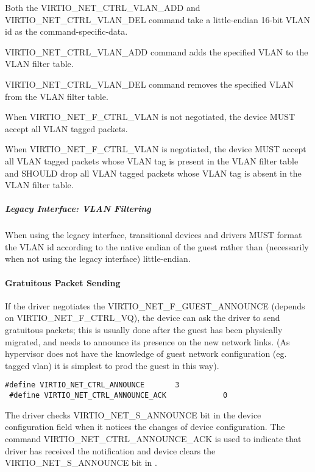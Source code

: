 Both the VIRTIO_NET_CTRL_VLAN_ADD and VIRTIO_NET_CTRL_VLAN_DEL
command take a little-endian 16-bit VLAN id as the command-specific-data.

VIRTIO_NET_CTRL_VLAN_ADD command adds the specified VLAN to the
VLAN filter table.

VIRTIO_NET_CTRL_VLAN_DEL command removes the specified VLAN from
the VLAN filter table.


When VIRTIO_NET_F_CTRL_VLAN is not negotiated, the device MUST
accept all VLAN tagged packets.

When VIRTIO_NET_F_CTRL_VLAN is negotiated, the device MUST
accept all VLAN tagged packets whose VLAN tag is present in
the VLAN filter table and SHOULD drop all VLAN tagged packets
whose VLAN tag is absent in the VLAN filter table.

\subparagraph{Legacy Interface: VLAN Filtering}\label{sec:Device Types / Network Device / Device Operation / Control Virtqueue / VLAN Filtering / Legacy Interface: VLAN Filtering}
When using the legacy interface, transitional devices and drivers
MUST format the VLAN id
according to the native endian of the guest rather than
(necessarily when not using the legacy interface) little-endian.

\paragraph{Gratuitous Packet Sending}\label{sec:Device Types / Network Device / Device Operation / Control Virtqueue / Gratuitous Packet Sending}

If the driver negotiates the VIRTIO_NET_F_GUEST_ANNOUNCE (depends
on VIRTIO_NET_F_CTRL_VQ), the device can ask the driver to send gratuitous
packets; this is usually done after the guest has been physically
migrated, and needs to announce its presence on the new network
links. (As hypervisor does not have the knowledge of guest
network configuration (eg. tagged vlan) it is simplest to prod
the guest in this way).

\begin{lstlisting}
#define VIRTIO_NET_CTRL_ANNOUNCE       3
 #define VIRTIO_NET_CTRL_ANNOUNCE_ACK             0
\end{lstlisting}

The driver checks VIRTIO_NET_S_ANNOUNCE bit in the device configuration  field
when it notices the changes of device configuration. The
command VIRTIO_NET_CTRL_ANNOUNCE_ACK is used to indicate that
driver has received the notification and device clears the
VIRTIO_NET_S_ANNOUNCE bit in .

